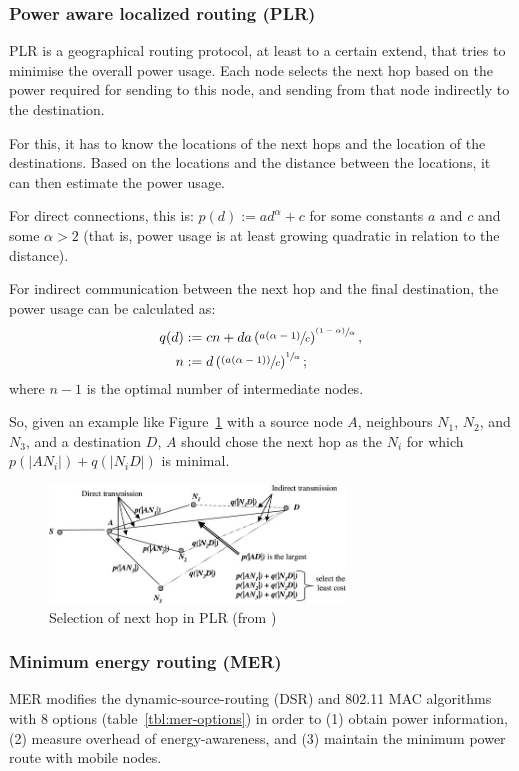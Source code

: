\subsubsection{Power aware localized routing (PLR)}
PLR\cite{stojmenovic2001power} is a geographical routing protocol, at least
to a certain extend, that tries to minimise the overall power usage. Each node
selects the next hop based on the power required for sending to this node, and
sending from that node indirectly to the destination.

For this, it has to know the locations of the next hops and the location of
the destinations. Based on the locations and the distance between the locations,
it can then estimate the power usage.

For direct connections, this is:
\( p(d) := ad^{\alpha} + c \)
for some constants $a$ and $c$ and some $\alpha > 2$ (that is, power usage
is at least growing quadratic in relation to the distance).

For indirect communication between the next hop and the final destination,
the power usage can be calculated as:
\begin{align*}
   q(d) &:= cn + da \left(\sfrac{a(\alpha - 1)}{c}\right)^{\sfrac{(1-\alpha)}{\alpha}}, \\
      n &:= d\left(\sfrac{(a(\alpha - 1))}{c}\right)^{\sfrac{1}{\alpha}};
\end{align*}
where $n-1$ is the optimal number of intermediate nodes\cite{stojmenovic2001power}.

So, given an example like Figure~\ref{plrexample} with a source node $A$, neighbours $N_{1}$, $N_{2}$, and $N_{3}$, and a
destination $D$, $A$ should chose the next hop as the $N_{i}$ for which
$p(|AN_{i}|) + q(|N_{i}D|)$ is minimal.

\begin{figure}
\centering
\includegraphics[width=0.7\textwidth]{images/plr-example}
\caption{Selection of next hop in PLR (from \cite{alotaibi2012survey})}
\label{plrexample}
\end{figure}

\subsubsection{Minimum energy routing (MER)}
MER\cite{doshi2002demand} modifies the dynamic-source-routing (DSR)\cite{johnson1996dynamic}
and 802.11 MAC algorithms\cite{woesner1998power} with 8 options (table~\ref{tbl:mer-options}) in order to
(1) obtain power information, (2) measure overhead of energy-awareness, and
(3) maintain the minimum power route with mobile nodes.

